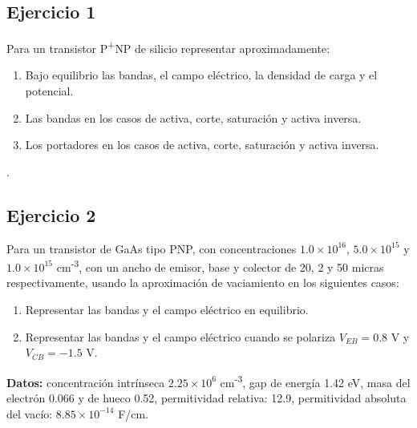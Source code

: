 \begin{Enunciado}
\subsection*{Ejercicio 1} 
Para un transistor P\textsuperscript{+}NP de silicio representar aproximadamente:
\begin{enumerate}[label=\alph*)]
    \item Bajo equilibrio las bandas, el campo eléctrico, la densidad de carga y el potencial.
    \item Las bandas en los casos de activa, corte, saturación y activa inversa.
    \item Los portadores en los casos de activa, corte, saturación y activa inversa.
\end{enumerate}
\end{Enunciado}

\vspace*{1em}

\lipsum[1].

\vspace*{2em}



\begin{Enunciado}
\subsection*{Ejercicio 2} 
Para un transistor de GaAs tipo PNP, con concentraciones $1.0 \times 10^{16}$, $5.0 \times 10^{15}$ y $1.0 \times 10^{15}$ cm\textsuperscript{-3}, con un ancho de emisor, base y colector de 20, 2 y 50 micras respectivamente, usando la aproximación de vaciamiento en los siguientes casos:
    \begin{enumerate}[label=\alph*)]
        \item Representar las bandas y el campo eléctrico en equilibrio.
        \item Representar las bandas y el campo eléctrico cuando se polariza $V_{EB} = 0.8$ V y $V_{CB} = -1.5$ V.
    \end{enumerate}
\textbf{Datos:} concentración intrínseca $2.25 \times 10^6$ cm\textsuperscript{-3}, gap de energía 1.42 eV, masa del electrón 0.066 y de hueco 0.52, permitividad relativa: 12.9, permitividad absoluta del vacío: $8.85 \times 10^{-14}$ F/cm.
\end{Enunciado}

\vspace*{1em}

